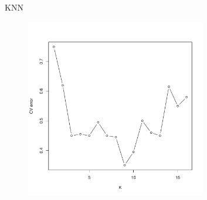 \documentclass{beamer}
\begin{document}
\begin{frame}{KNN}
  \begin{figure}
    \begin{center}
      \includegraphics[width=0.7\textwidth]{knn_tuning.pdf}
    \end{center}
  \end{figure}
\end{frame}
\end{document}
